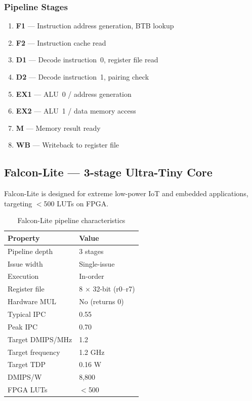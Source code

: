 \documentclass[11pt,a4paper]{article}
\begin{document}
\subsubsection*{Pipeline Stages}
\begin{enumerate}[nosep]
  \item \textbf{F1} --- Instruction address generation, BTB lookup
  \item \textbf{F2} --- Instruction cache read
  \item \textbf{D1} --- Decode instruction~0, register file read
  \item \textbf{D2} --- Decode instruction~1, pairing check
  \item \textbf{EX1} --- ALU~0 / address generation
  \item \textbf{EX2} --- ALU~1 / data memory access
  \item \textbf{M} --- Memory result ready
  \item \textbf{WB} --- Writeback to register file
\end{enumerate}

\subsection{Falcon-Lite --- 3-stage Ultra-Tiny Core}

Falcon-Lite is designed for extreme low-power IoT and embedded
applications, targeting ${<}$500 LUTs on FPGA.

\begin{table}[H]
\centering
\caption{Falcon-Lite pipeline characteristics}
\begin{tabular}{ll}
\toprule
Property & Value \\
\midrule
Pipeline depth & 3 stages \\
Issue width & Single-issue \\
Execution & In-order \\
Register file & 8 $\times$ 32-bit (r0--r7) \\
Hardware MUL & No (returns 0) \\
Typical IPC & 0.55 \\
Peak IPC & 0.70 \\
Target DMIPS/MHz & 1.2 \\
Target frequency & 1.2 GHz \\
Target TDP & 0.16 W \\
DMIPS/W & 8,800 \\
FPGA LUTs & ${<}$500 \\
\bottomrule
\end{tabular}
\end{table}
\end{document}
